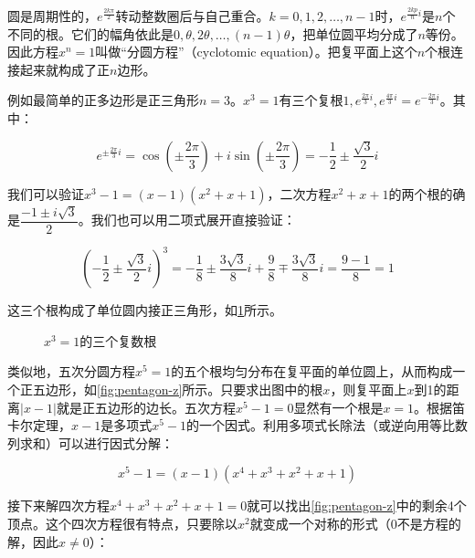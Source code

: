 \documentclass[b5paper]{ctexart}
\begin{document}
圆是周期性的，$e^{\frac{2k\pi}{2}}$转动整数圈后与自己重合。$k = 0, 1, 2, \dotsc, n-1$时，$e^{\frac{2kp}{n}i}$是$n$个不同的根。它们的幅角依此是$0, \theta, 2\theta, \dotsc, (n-1)\theta$，把单位圆平均分成了$n$等份。因此方程$x^n = 1$叫做“分圆方程”（cyclotomic equation）。把复平面上这个$n$个根连接起来就构成了正$n$边形。

例如最简单的正多边形是正三角形$n = 3$。$x^3 = 1$有三个复根$1, e^{\frac{2\pi}{3}i}, e^{\frac{4\pi}{3}i} = e^{-\frac{2\pi}{3}i}$。其中：

\[
e^{\pm \frac{2\pi}{3}i} = \cos (\pm \frac{2\pi}{3}) + i \sin (\pm \frac{2\pi}{3}) = -\frac{1}{2} \pm \frac{\sqrt{3}}{2}i
\]

我们可以验证$x^3 - 1 = (x - 1)(x^2 + x + 1)$，二次方程$x^2 + x + 1$的两个根的确是$\dfrac{-1 \pm i\sqrt{3}}{2}$。我们也可以用二项式展开直接验证：

\[
(-\frac{1}{2} \pm \frac{\sqrt{3}}{2}i)^3 = -\frac{1}{8} \pm \frac{3\sqrt{3}}{8}i + \frac{9}{8} \mp \frac{3\sqrt{3}}{8}i = \frac{9-1}{8} = 1
\]

这三个根构成了单位圆内接正三角形，如\cref{fig:3rd-root-of-1}所示。

\begin{figure}[htbp]
\centering
{}
\caption{$x^3 = 1$的三个复数根}
\label{fig:3rd-root-of-1}
\end{figure}

类似地，五次分圆方程$x^5 = 1$的五个根均匀分布在复平面的单位圆上，从而构成一个正五边形，如\cref{fig:pentagon-z}所示。只要求出图中的根$x$，则复平面上$x$到1的距离$|x-1|$就是正五边形的边长。五次方程$x^5 - 1 = 0$显然有一个根是$x = 1$。根据笛卡尔定理，$x-1$是多项式$x^5 - 1$的一个因式。利用多项式长除法（或逆向用等比数列求和）可以进行因式分解：

\[
x^5 - 1 = (x - 1)(x^4 + x^3 + x^2 + x + 1)
\]

接下来解四次方程$x^4 + x^3 + x^2 + x + 1 = 0$就可以找出\cref{fig:pentagon-z}中的剩余4个顶点。这个四次方程很有特点，只要除以$x^2$就变成一个对称的形式（0不是方程的解，因此$x \ne 0$）：
\end{document}
